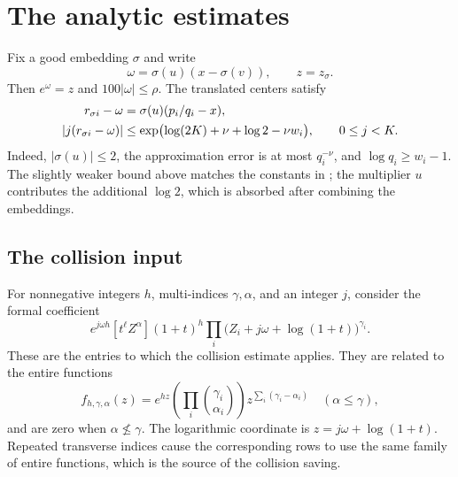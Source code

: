\documentclass[11pt]{article}
\theoremstyle{definition}
\theoremstyle{remark}
\theoremstyle{plain}
\begin{document}
\section{The analytic estimates}\label{sec:analytic}
Fix a good embedding \(\sigma\) and write
\[
 \omega=\sigma(u)(x-\sigma(v)),\qquad z=z_\sigma.
\]
Then \(e^\omega=z\) and \(100|\omega|\le\rho\). The translated
centers satisfy
\begin{align}
 r_{\sigma i}-\omega&=\sigma(u)(p_i/q_i-x),\label{eq:affineerror}\\
 |j(r_{\sigma i}-\omega)|
 &\le\exp\bigl(\log(2K)+\nu+\log2-\nu w_i\bigr),
 \qquad 0\le j<K.\notag
\end{align}
Indeed, \(|\sigma(u)|\le2\), the approximation error is at most
\(q_i^{-\nu}\), and \(\log q_i\ge w_i-1\). The slightly weaker
bound above matches the constants in \cite{rational}; the multiplier
\(u\) contributes the additional \(\log2\), which is absorbed after
combining the embeddings.

\subsection{The collision input}
For nonnegative integers \(h\), multi-indices \(\gamma,\alpha\), and
an integer \(j\), consider the formal coefficient
\[
 e^{j\omega h}[t^\ell Z^\alpha]
 (1+t)^h\prod_i\bigl(Z_i+j\omega+\log(1+t)\bigr)^{\gamma_i}.
\]
These are the entries to which the collision estimate applies.
They are related to the entire functions
\begin{equation}\label{eq:columnfunction}
 f_{h,\gamma,\alpha}(z)
 =e^{hz}\left(\prod_i\binom{\gamma_i}{\alpha_i}\right)
           z^{\sum_i(\gamma_i-\alpha_i)}
 \quad(\alpha\le\gamma),
\end{equation}
and are zero when \(\alpha\not\le\gamma\). The logarithmic
coordinate is \(z=j\omega+\log(1+t)\). Repeated transverse
indices cause the corresponding rows to use the same family of entire
functions, which is the source of the collision saving.
\end{document}
